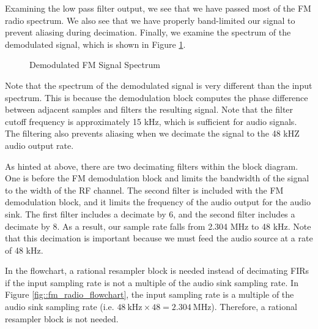 \documentclass{article}
\begin{document}
\noindent Examining the low pass filter output, we see that we have passed most of the FM radio spectrum. We also see that we have properly band-limited our signal to prevent aliasing during decimation. Finally, we examine the spectrum of the demodulated signal, which is shown in Figure \ref{fig::fm_radio_demod_spectrum}.

\begin{figure}[H]
	\centerline{}
	\caption{Demodulated FM Signal Spectrum}
	\label{fig::fm_radio_demod_spectrum}
\end{figure}

\noindent Note that the spectrum of the demodulated signal is very different than the input spectrum. This is because the demodulation block computes the phase difference between adjacent samples and filters the resulting signal. Note that the filter cutoff frequency is approximately 15 kHz, which is sufficient for audio signals. The filtering also prevents aliasing when we decimate the signal to the 48 kHZ audio output rate.

As hinted at above, there are two decimating filters within the block diagram. One is before the FM demodulation block and limits the bandwidth of the signal to the width of the RF channel. The second filter is included with the FM demodulation block, and it limits the frequency of the audio output for the audio sink. The first filter includes a decimate by 6, and the second filter includes a decimate by 8. As a result, our sample rate falls from 2.304 MHz to 48 kHz. Note that this decimation is important because we must feed the audio source at a rate of 48 kHz.

In the flowchart, a rational resampler block is needed instead of decimating FIRs if the input sampling rate is not a multiple of the audio sink sampling rate. In Figure \ref{fig::fm_radio_flowchart}, the input sampling rate is a multiple of the audio sink sampling rate (i.e. $48\ \text{kHz} \times 48 = 2.304\ \text{MHz}$). Therefore, a rational resampler block is not needed.
\end{document}
